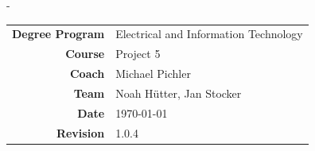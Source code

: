\begin{titlingpage}
\begin{SingleSpace}
\begin{adjustwidth*}{\unitlength}{-\unitlength}
\begin{center}
\begin{tabular}{>{\bfseries}rl}
        \large Degree Program & Electrical and Information Technology \\[2mm]
        \large Course         & Project 5\\[2mm]
        \large Coach        & Michael Pichler \\[2mm]
        \large Team           & Noah H\"utter, Jan Stocker \\[2mm]
        \large Date           & \today \\[2mm]
        \large Revision       & 1.0.4 \\[2mm]
\end{tabular}

\vspace{12mm}
\end{center}
\end{adjustwidth*}
\end{SingleSpace}

\tikzexternaldisable
{}
\tikzexternalenable

\end{titlingpage}
